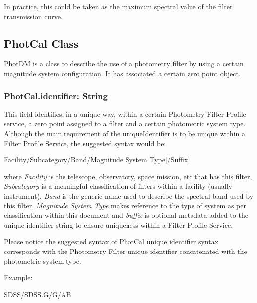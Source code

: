 \documentclass[11pt,a4paper]{ivoa}
\begin{document}
In practice, this could be taken as the maximum spectral value of the filter transmission
curve.\par

\subsection{PhotCal Class}
PhotDM is a class to describe the use of a photometry filter by using a certain magnitude system
configuration. It has associated a certain zero point object.
\par

\subsubsection{PhotCal.identifier: String}
This field identifies, in a unique way, within a certain Photometry Filter Profile
service, a zero point assigned to a filter and a certain photometric system type.
Although the main requirement of the uniqueIdentifier is to be unique within a Filter
Profile Service, the suggested syntax would be:
\par

Facility/Subcategory/Band/Magnitude System Type[/Suffix]
\bigskip


where \textit{Facility} is the telescope, observatory, space mission, etc that
has this filter, \textit{Subcategory} is a meaningful classification of filters
within a facility (usually instrument), \textit{Band} is the generic name used to
describe the spectral band used by this filter, \textit{Magnitude System Type}
makes reference to the type of system as per classification within this document
and \textit{Suffix} is optional metadata added to the unique identifier string to
ensure uniqueness within a Filter Profile Service.
\par

Please notice the suggested syntax of PhotCal unique identifier syntax corresponds
with the Photometry Filter unique identifier concatenated with the photometric
system type.
\par

Example:
\par



SDSS/SDSS.G/G/AB
\bigskip


\end{document}
